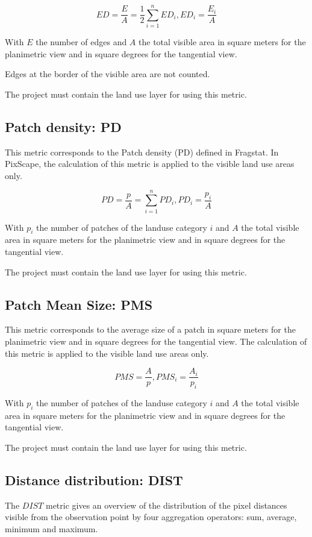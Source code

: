 \documentclass{report}
\begin{document}
$$ED = \frac{E}{A} = \frac{1}{2} \sum_{i=1}^{n} ED_i, ED_i = \frac{E_i}{A}$$

With $E$ the number of edges and $A$ the total visible area in square meters for the planimetric view and in square degrees for the tangential view.

Edges at the border of the visible area are not counted.

The project must contain the land use layer for using this metric.

\subsection{Patch density: PD}
This metric corresponds to the Patch density (PD) defined in Fragstat. In PixScape, the calculation of this metric is applied to the visible land use areas only.

$$PD = \frac{p}{A} = \sum_{i=1}^{n} PD_i, PD_i = \frac{p_i}{A}$$

With $p_i$ the number of patches of the landuse category $i$ and $A$ the total visible area in square meters for the planimetric view and in square degrees for the tangential view.

The project must contain the land use layer for using this metric.

\subsection{Patch Mean Size: PMS}
This metric corresponds to the average size of a patch in square meters for the planimetric view and in square degrees for the tangential view. The calculation of this metric is applied to the visible land use areas only.

$$PMS = \frac{A}{p}, PMS_i = \frac{A_i}{p_i}$$

With $p_i$ the number of patches of the landuse category $i$ and $A$ the total visible area in square meters for the planimetric view and in square degrees for the tangential view.

The project must contain the land use layer for using this metric.

\subsection{Distance distribution: DIST}

The $DIST$ metric gives an overview of the distribution of the pixel distances visible from the observation point by four aggregation operators: sum, average, minimum and maximum.
\end{document}
